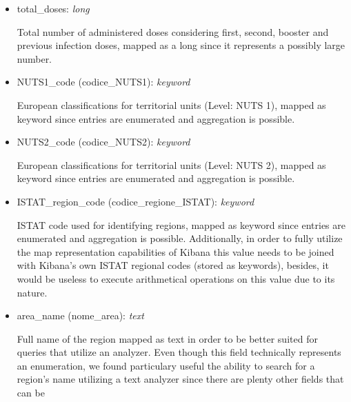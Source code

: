 \documentclass[12pt, a4paper]{article}
\begin{document}
\begin{itemize}
\begin{itemize}
      \item total\_doses: \emph{long} \\
        \begin{footnotesize}
          Total number of administered doses considering first, second, booster and previous 
          infection doses, mapped as a long since it represents a possibly large number.
        \end{footnotesize}
      \item NUTS1\_code (codice\_NUTS1): \emph{keyword} \\
        \begin{footnotesize}
          European classifications for territorial units (Level: NUTS 1), mapped as 
          keyword since entries are enumerated and aggregation is possible.
        \end{footnotesize}
      \item NUTS2\_code (codice\_NUTS2): \emph{keyword} \\
        \begin{footnotesize}
          European classifications for territorial units (Level: NUTS 2), mapped as 
          keyword since entries are enumerated and aggregation is possible.
        \end{footnotesize}
      \item ISTAT\_region\_code (codice\_regione\_ISTAT): \emph{keyword} \\
        \begin{footnotesize}
          ISTAT code used for identifying regions, mapped as keyword since entries are 
          enumerated and aggregation is possible. Additionally, in order to fully utilize
          the map representation capabilities of Kibana this value needs to be joined 
          with Kibana's own ISTAT regional codes (stored as keywords), besides, it would 
          be useless to execute arithmetical operations on this value due to its nature.
        \end{footnotesize}
      \item area\_name (nome\_area): \emph{text} \\
        \begin{footnotesize}
          Full name of the region mapped as text in order to be better suited for queries
          that utilize an analyzer. Even though this field technically represents an 
          enumeration, we found particulary useful the ability to search for a region's 
          name utilizing a text analyzer since there are plenty other fields that can be 

\end{footnotesize}
\end{itemize}
\end{itemize}
\end{document}
